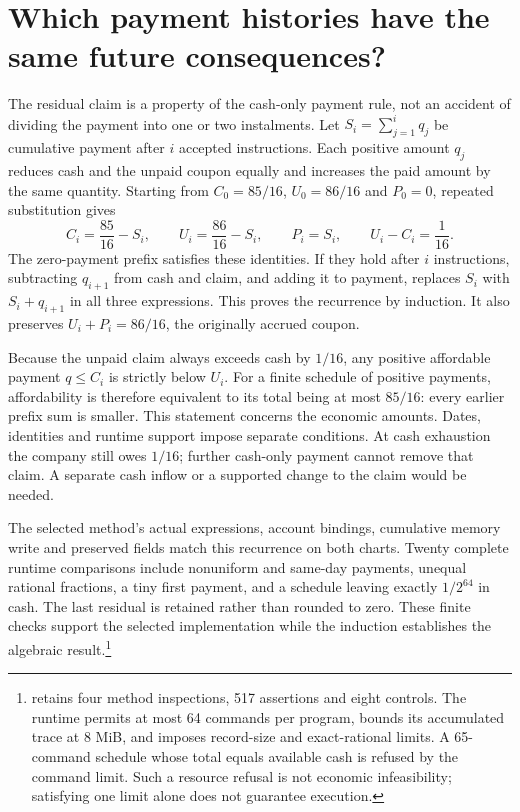 \section{Which payment histories have the same future consequences?}
\label{sim:coupon-continuation-scope}

The residual claim is a property of the cash-only payment rule, not an accident of dividing the payment into one or two instalments. Let $S_i=\sum_{j=1}^i q_j$ be cumulative payment after $i$ accepted instructions. Each positive amount $q_j$ reduces cash and the unpaid coupon equally and increases the paid amount by the same quantity. Starting from $C_0=85/16$, $U_0=86/16$ and $P_0=0$, repeated substitution gives
\begin{equation}
 C_i=\frac{85}{16}-S_i,\qquad
 U_i=\frac{86}{16}-S_i,\qquad P_i=S_i,
 \qquad U_i-C_i=\frac1{16}.
 \label{eq:coupon-schedule-invariant}
\end{equation}
The zero-payment prefix satisfies these identities. If they hold after $i$ instructions, subtracting $q_{i+1}$ from cash and claim, and adding it to payment, replaces $S_i$ with $S_i+q_{i+1}$ in all three expressions. This proves the recurrence by induction. It also preserves $U_i+P_i=86/16$, the originally accrued coupon.

Because the unpaid claim always exceeds cash by $1/16$, any positive affordable payment $q\le C_i$ is strictly below $U_i$. For a finite schedule of positive payments, affordability is therefore equivalent to its total being at most $85/16$: every earlier prefix sum is smaller. This statement concerns the economic amounts. Dates, identities and runtime support impose separate conditions. At cash exhaustion the company still owes $1/16$; further cash-only payment cannot remove that claim. A separate cash inflow or a supported change to the claim would be needed.

The selected method's actual expressions, account bindings, cumulative memory write and preserved fields match this recurrence on both charts. Twenty complete runtime comparisons include nonuniform and same-day payments, unequal rational fractions, a tiny first payment, and a schedule leaving exactly $1/2^{64}$ in cash. The last residual is retained rather than rounded to zero. These finite checks support the selected implementation while the induction establishes the algebraic result.\footnote{ retains four method inspections, 517 assertions and eight controls. The runtime permits at most 64 commands per program, bounds its accumulated trace at 8 MiB, and imposes record-size and exact-rational limits. A 65-command schedule whose total equals available cash is refused by the command limit. Such a resource refusal is not economic infeasibility; satisfying one limit alone does not guarantee execution.}

